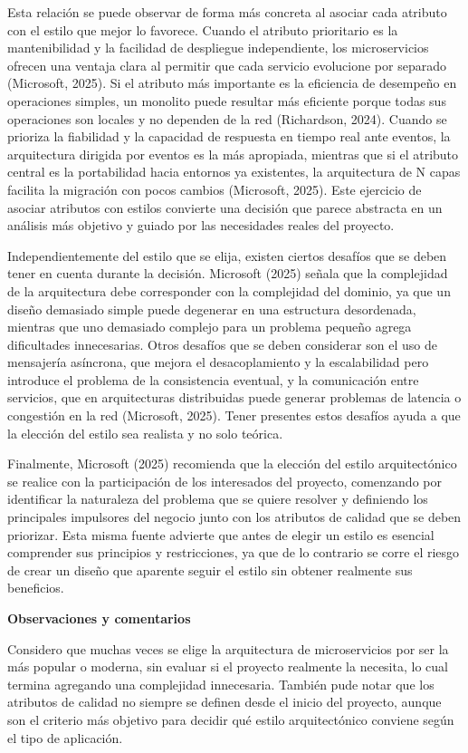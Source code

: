 \documentclass[12pt,letterpaper]{article}
\newcommand{\subtitulo}[1]{\vspace{12pt}\noindent\textbf{#1}\par\vspace{10pt}}
\begin{document}
Esta relación se puede observar de forma más concreta al asociar cada atributo con el estilo que mejor lo favorece. Cuando el atributo prioritario es la mantenibilidad y la facilidad de despliegue independiente, los microservicios ofrecen una ventaja clara al permitir que cada servicio evolucione por separado (Microsoft, 2025). Si el atributo más importante es la eficiencia de desempeño en operaciones simples, un monolito puede resultar más eficiente porque todas sus operaciones son locales y no dependen de la red (Richardson, 2024). Cuando se prioriza la fiabilidad y la capacidad de respuesta en tiempo real ante eventos, la arquitectura dirigida por eventos es la más apropiada, mientras que si el atributo central es la portabilidad hacia entornos ya existentes, la arquitectura de N capas facilita la migración con pocos cambios (Microsoft, 2025). Este ejercicio de asociar atributos con estilos convierte una decisión que parece abstracta en un análisis más objetivo y guiado por las necesidades reales del proyecto.
 
Independientemente del estilo que se elija, existen ciertos desafíos que se deben tener en cuenta durante la decisión. Microsoft (2025) señala que la complejidad de la arquitectura debe corresponder con la complejidad del dominio, ya que un diseño demasiado simple puede degenerar en una estructura desordenada, mientras que uno demasiado complejo para un problema pequeño agrega dificultades innecesarias. Otros desafíos que se deben considerar son el uso de mensajería asíncrona, que mejora el desacoplamiento y la escalabilidad pero introduce el problema de la consistencia eventual, y la comunicación entre servicios, que en arquitecturas distribuidas puede generar problemas de latencia o congestión en la red (Microsoft, 2025). Tener presentes estos desafíos ayuda a que la elección del estilo sea realista y no solo teórica.
 
Finalmente, Microsoft (2025) recomienda que la elección del estilo arquitectónico se realice con la participación de los interesados del proyecto, comenzando por identificar la naturaleza del problema que se quiere resolver y definiendo los principales impulsores del negocio junto con los atributos de calidad que se deben priorizar. Esta misma fuente advierte que antes de elegir un estilo es esencial comprender sus principios y restricciones, ya que de lo contrario se corre el riesgo de crear un diseño que aparente seguir el estilo sin obtener realmente sus beneficios.
 
\subtitulo{Observaciones y comentarios}
Considero que muchas veces se elige la arquitectura de microservicios por ser la más popular o moderna, sin evaluar si el proyecto realmente la necesita, lo cual termina agregando una complejidad innecesaria. También pude notar que los atributos de calidad no siempre se definen desde el inicio del proyecto, aunque son el criterio más objetivo para decidir qué estilo arquitectónico conviene según el tipo de aplicación.
 
\end{document}
